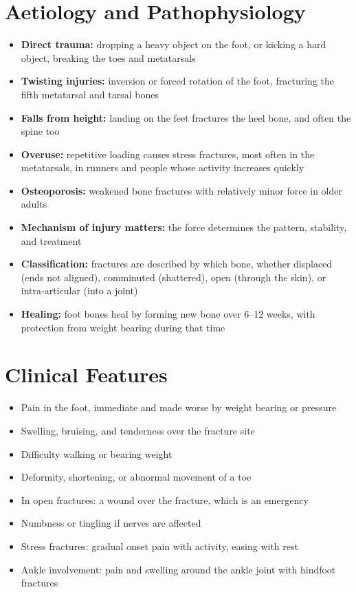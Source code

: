 \section*{Aetiology and Pathophysiology}
\begin{itemize}
    \item \textbf{Direct trauma:} dropping a heavy object on the foot, or kicking a hard object, breaking the toes and metatarsals
    \item \textbf{Twisting injuries:} inversion or forced rotation of the foot, fracturing the fifth metatarsal and tarsal bones
    \item \textbf{Falls from height:} landing on the feet fractures the heel bone, and often the spine too
    \item \textbf{Overuse:} repetitive loading causes stress fractures, most often in the metatarsals, in runners and people whose activity increases quickly
    \item \textbf{Osteoporosis:} weakened bone fractures with relatively minor force in older adults
    \item \textbf{Mechanism of injury matters:} the force determines the pattern, stability, and treatment
    \item \textbf{Classification:} fractures are described by which bone, whether displaced (ends not aligned), comminuted (shattered), open (through the skin), or intra-articular (into a joint)
    \item \textbf{Healing:} foot bones heal by forming new bone over 6--12 weeks, with protection from weight bearing during that time
\end{itemize}

\section*{Clinical Features}
\begin{itemize}
    \item Pain in the foot, immediate and made worse by weight bearing or pressure
    \item Swelling, bruising, and tenderness over the fracture site
    \item Difficulty walking or bearing weight
    \item Deformity, shortening, or abnormal movement of a toe
    \item In open fractures: a wound over the fracture, which is an emergency
    \item Numbness or tingling if nerves are affected
    \item Stress fractures: gradual onset pain with activity, easing with rest
    \item Ankle involvement: pain and swelling around the ankle joint with hindfoot fractures
\end{itemize}

